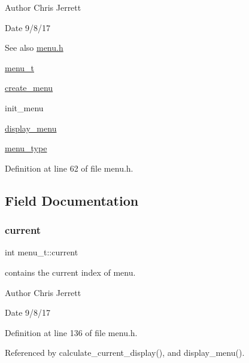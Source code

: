 \begin{DoxyAuthor}{Author}
Chris Jerrett 
\end{DoxyAuthor}
\begin{DoxyDate}{Date}
9/8/17 
\end{DoxyDate}
\begin{DoxySeeAlso}{See also}
\hyperlink{menu_8h}{menu.\+h} 

\hyperlink{structmenu__t}{menu\+\_\+t} 

\hyperlink{menu_8c_adcee778eac0edb821427d32949106dc5}{create\+\_\+menu} 

init\+\_\+menu 

\hyperlink{menu_8c_abfadedb104f89f672dd3045499975a71}{display\+\_\+menu} 

\hyperlink{menu_8h_a6bbf4baf5018b0d76aab6c2e6bf85e62}{menu\+\_\+type} 
\end{DoxySeeAlso}


Definition at line 62 of file menu.\+h.



\subsection{Field Documentation}
\mbox{\label{structmenu__t_a2acb18066898677ec5e2dc40eec811c5}} 
\subsubsection{\texorpdfstring{current}{current}}
{\footnotesize\ttfamily int menu\+\_\+t\+::current}



contains the current index of menu. 

\begin{DoxyAuthor}{Author}
Chris Jerrett 
\end{DoxyAuthor}
\begin{DoxyDate}{Date}
9/8/17 
\end{DoxyDate}


Definition at line 136 of file menu.\+h.



Referenced by calculate\+\_\+current\+\_\+display(), and display\+\_\+menu().

\mbox{\label{structmenu__t_a023063461c4a247e574abd6a55faf765}} 
